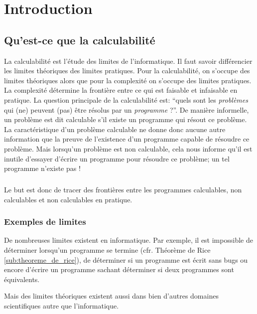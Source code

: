 
\chapter{Introduction}
\label{ch:introduction}

\section{Qu'est-ce que la calculabilité}
\label{sec:qu_est-ce_la_calculabilite}

La calculabilité est l'étude des limites de l'informatique. Il faut savoir différencier les limites théoriques des limites
pratiques. Pour la calculabilité, on s'occupe des limites théoriques alors que pour
la complexité on s'occupe des limites pratiques. La complexité
détermine la frontière entre ce qui est faisable et infaisable en pratique.
La question principale de la calculabilité est: ``quels sont les \textit{problèmes} qui (ne) peuvent (pas)
être résolus par un \textit{programme} ?''.  De manière informelle, un problème est dit calculable s'il existe un programme qui résout ce problème.  La caractéristique d'un problème calculable ne donne donc aucune
autre information que la preuve de l'existence d'un programme capable de résoudre ce problème.  Mais lorsqu'un problème est non calculable, cela nous informe qu'il est inutile d'essayer d'écrire un programme pour résoudre ce problème; un tel programme n'existe pas !

\paragraph{} Le but est donc de tracer des frontières entre les programmes calculables,
non calculables et non calculables en pratique.

\subsection{Exemples de limites}
\label{subsec:exemples_limites}

De nombreuses limites existent en informatique. Par exemple, il est impossible de déterminer lorsqu'un programme se termine (cfr. Théorème de Rice \ref{sub:theoreme_de_rice}), de déterminer si un programme est écrit sans bugs ou encore d'écrire un programme sachant déterminer si deux programmes sont équivalents.

Mais des limites théoriques existent aussi dans bien d'autres domaines scientifiques autre que l'informatique.

